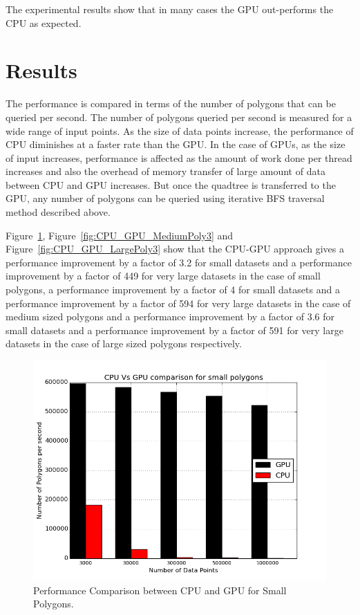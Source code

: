 %
%
%
%
%
The experimental results show that in many cases the GPU out-performs the CPU as
expected.  

\section{Results}
The performance is compared in terms of the number of polygons that can be queried per second. The number of polygons queried per second is measured for a wide range of input points. As the size of  data points increase, the performance of CPU diminishes at a faster rate than the GPU. In the case of GPUs, as the size of input increases, performance is affected as the amount of work done per thread increases and also the overhead of memory transfer of large amount of data between CPU and GPU increases.  But once the quadtree is transferred to the GPU, any number of polygons can be queried using iterative BFS traversal method described above.

Figure~\ref{fig:CPU_GPU_SmallPoly3}, Figure~\ref{fig:CPU_GPU_MediumPoly3} and Figure~\ref{fig:CPU_GPU_LargePoly3} show that the CPU-GPU approach gives a performance improvement 
by a factor of 3.2 for small datasets and a performance improvement by a factor of 449 for very large datasets in the case of small polygons, a performance improvement by a factor of 4 for small datasets and a performance improvement by a factor of 594 for very large datasets in the case of medium sized polygons and a performance improvement by a factor of 3.6 for small datasets and a performance improvement by a factor of 591 for very large datasets in the case of large sized polygons respectively.

\begin{figure}[H]
\centering
\vspace{0.5in}
\includegraphics[scale=0.5]{Images/CPU_GPU_SmallPoly3}
\vspace{0.5in}
\caption{Performance Comparison between CPU and GPU for Small Polygons.}
\label{fig:CPU_GPU_SmallPoly3}
\end{figure}

